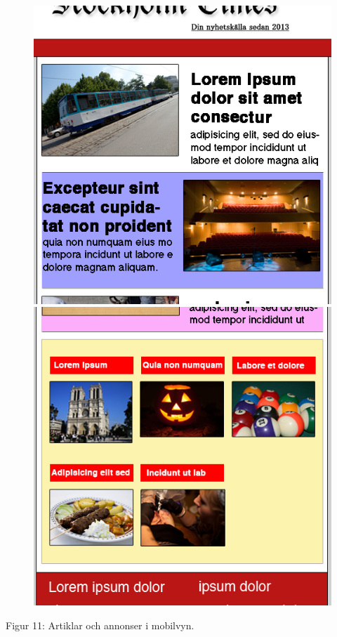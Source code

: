 \documentclass[11pt]{article}
\begin{document}
\begin{figure}[H]
\centerline{%
\includegraphics[scale=0.35]{pics/artikelmobil.png}\hspace{2em}%
\includegraphics[scale=0.35]{pics/annonsmobil.png}%
}
\end{figure}
\hspace{0.5cm}Figur 11: Artiklar och annonser i mobilvyn.
\end{document}

